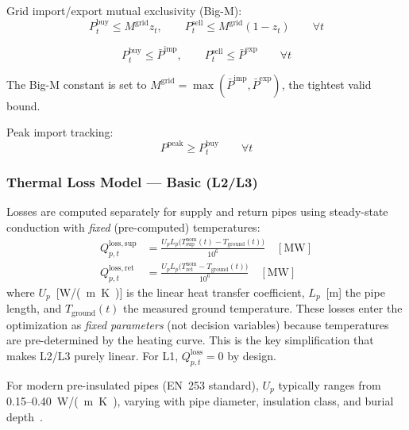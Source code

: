\documentclass[review,3p]{elsarticle}
\begin{document}
Grid import/export mutual exclusivity (Big-M):
\begin{equation}
P_t^{\mathrm{buy}} \leq M^{\mathrm{grid}} z_t, \qquad
P_t^{\mathrm{sell}} \leq M^{\mathrm{grid}} (1 - z_t)
\qquad \forall t
\label{eq:grid_bigm}
\end{equation}

\begin{equation}
P_t^{\mathrm{buy}} \leq \bar{P}^{\mathrm{imp}}, \qquad
P_t^{\mathrm{sell}} \leq \bar{P}^{\mathrm{exp}}
\qquad \forall t
\label{eq:grid_cap}
\end{equation}

The Big-M constant is set to
$M^{\mathrm{grid}} = \max(\bar{P}^{\mathrm{imp}},
\bar{P}^{\mathrm{exp}})$, the tightest valid bound.

Peak import tracking:
\begin{equation}
P^{\mathrm{peak}} \geq P_t^{\mathrm{buy}} \qquad \forall t
\label{eq:peak}
\end{equation}

\subsubsection{Thermal Loss Model --- Basic (L2/L3)}
\label{sec:model_losses}

Losses are computed separately for supply and return pipes using
steady-state conduction with \emph{fixed} (pre-computed)
temperatures:
\begin{align}
Q_{p,t}^{\mathrm{loss,sup}} &= \frac{U_p L_p \big(
T_{\mathrm{sup}}^{\mathrm{nom}}(t) - T_{\mathrm{ground}}(t)\big)}{10^6}
\quad [\mathrm{MW}]
\label{eq:loss_supply} \\
Q_{p,t}^{\mathrm{loss,ret}} &= \frac{U_p L_p \big(
T_{\mathrm{ret}}^{\mathrm{nom}} - T_{\mathrm{ground}}(t)\big)}{10^6}
\quad [\mathrm{MW}]
\label{eq:loss_return}
\end{align}
where $U_p$~[\si{W/(m.K)}] is the linear heat transfer coefficient,
$L_p$~[m] the pipe length, and $T_{\mathrm{ground}}(t)$ the measured
ground temperature. These losses enter the optimization as
\emph{fixed parameters} (not decision variables) because temperatures
are pre-determined by the heating curve. This is the key simplification
that makes L2/L3 purely linear. For L1,
$Q_{p,t}^{\mathrm{loss}} = 0$ by design.

For modern pre-insulated pipes (EN~253 standard), $U_p$ typically
ranges from 0.15--0.40~\si{W/(m.K)}, varying with pipe diameter,
insulation class, and burial depth~\cite{Frederiksen2013}.
\end{document}
